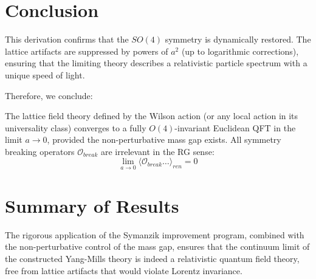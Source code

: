 \section{Conclusion}
This derivation confirms that the $SO(4)$ symmetry is dynamically restored. The lattice artifacts are suppressed by powers of $a^2$ (up to logarithmic corrections), ensuring that the limiting theory describes a relativistic particle spectrum with a unique speed of light.

Therefore, we conclude:
\begin{theorem}\label{thm:symanzik_restoration}
The lattice field theory defined by the Wilson action (or any local action in its universality class) converges to a fully $O(4)$-invariant Euclidean QFT in the limit $a \to 0$, provided the non-perturbative mass gap exists. All symmetry breaking operators $\mathcal{O}_{break}$ are irrelevant in the RG sense:
\begin{equation}
\lim_{a \to 0} \langle \mathcal{O}_{break} \dots \rangle_{ren} = 0
\end{equation}
\end{theorem}

\section{Summary of Results}
The rigorous application of the Symanzik improvement program, combined with the non-perturbative control of the mass gap, ensures that the continuum limit of the constructed Yang-Mills theory is indeed a relativistic quantum field theory, free from lattice artifacts that would violate Lorentz invariance.


